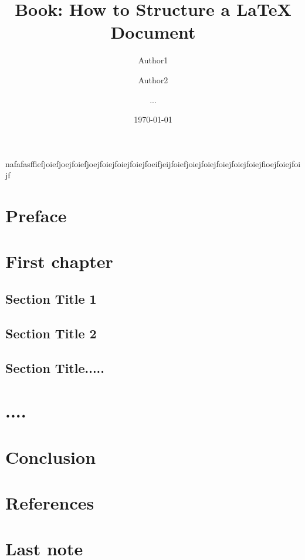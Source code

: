\documentclass[11pt,a4paper]{book}
\begin{document}
\title{Book: How to Structure a LaTeX Document}
\author{Author1 \and Author2 \and ...}
\date{\today}

\maketitle
nafafasffiefjoiefjoejfoiefjoejfoiejfoiejfoiejfoeifjeijfoiefjoiejfoiejfoiejfoiejfoiejfioejfoiejfoijf

\frontmatter

\chapter{Preface}

\mainmatter
\chapter{First chapter}
\section{Section Title 1}
\section{Section Title 2}
\section{Section Title.....}

\chapter{....}

\chapter{Conclusion}

\chapter*{References}


\backmatter
\chapter{Last note}
\end{document}
